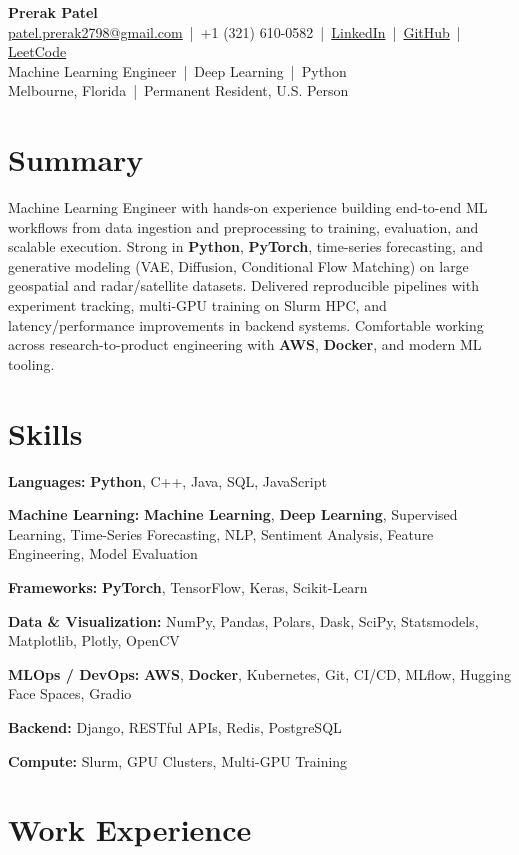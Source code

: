 \documentclass[a4paper,10pt]{article}
\newcommand{\resumeHeader}[8]{
    \begin{center}
        {\LARGE \textbf{#1}}\\
        \href{mailto:#2}{#2} \,|\, #3 \,|\, \href{#4}{LinkedIn} \,|\, \href{#5}{GitHub} \,|\, \href{#6}{LeetCode}\\
        #7\\
        #8
    \end{center}
}
\newcommand{\skillLine}[2]{%
    \noindent\textbf{#1:} #2\par\vspace{0pt}%
}
\begin{document}
\vspace*{-35pt}

\resumeHeader
{Prerak Patel}
{patel.prerak2798@gmail.com}
{+1 (321) 610-0582}
{https://www.linkedin.com/in/prerakpatel51020021998/}
{https://github.com/prerakpatel51}
{https://leetcode.com/u/PrerakPatel510/}
{Machine Learning Engineer \,|\, Deep Learning \,|\, Python}
{Melbourne, Florida \,|\, Permanent Resident, U.S. Person}

\vspace{-8pt}

\section*{Summary}
Machine Learning Engineer with hands-on experience building end-to-end ML workflows from data ingestion and preprocessing to training, evaluation, and scalable execution. Strong in \textbf{Python}, \textbf{PyTorch}, time-series forecasting, and generative modeling (VAE, Diffusion, Conditional Flow Matching) on large geospatial and radar/satellite datasets. Delivered reproducible pipelines with experiment tracking, multi-GPU training on Slurm HPC, and latency/performance improvements in backend systems. Comfortable working across research-to-product engineering with \textbf{AWS}, \textbf{Docker}, and modern ML tooling.

\section*{Skills}
\skillLine{Languages}{\textbf{Python}, C++, Java, SQL, JavaScript}
\skillLine{Machine Learning}{\textbf{Machine Learning}, \textbf{Deep Learning}, Supervised Learning, Time-Series Forecasting, NLP, Sentiment Analysis, Feature Engineering, Model Evaluation}
\skillLine{Frameworks}{\textbf{PyTorch}, TensorFlow, Keras, Scikit-Learn}
\skillLine{Data \& Visualization}{NumPy, Pandas, Polars, Dask, SciPy, Statsmodels, Matplotlib, Plotly, OpenCV}
\skillLine{MLOps / DevOps}{\textbf{AWS}, \textbf{Docker}, Kubernetes, Git, CI/CD, MLflow, Hugging Face Spaces, Gradio}
\skillLine{Backend}{Django, RESTful APIs, Redis, PostgreSQL}
\skillLine{Compute}{Slurm, GPU Clusters, Multi-GPU Training}
\vspace{-2pt}

\section*{Work Experience}
\end{document}
